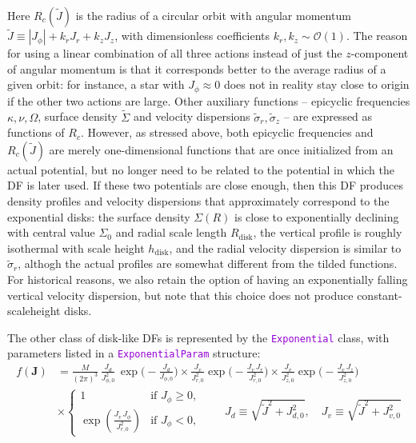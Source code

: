 \documentclass[12pt]{article}
\newcommand{\ttt}[1]{\textcolor{darkviolet}{\texttt{#1}}}
\newcommand{\bJ}{\boldsymbol{J}}
\begin{document}
Here $R_c(\tilde J)$ is the radius of a circular orbit with angular momentum $\tilde J\equiv |J_\phi| + k_r J_r + k_z J_z$, with dimensionless coefficients $k_r,k_z\sim \mathcal{O}(1)$. The reason for using a linear combination of all three actions instead of just the $z$-component of angular momentum is that it corresponds better to the average radius of a given orbit: for instance, a star with $J_\phi\approx 0$ does not in reality stay close to origin if the other two actions are large. Other auxiliary functions -- epicyclic frequencies $\kappa,\nu,\Omega$, surface density $\tilde\Sigma$ and velocity dispersions $\tilde\sigma_r,\tilde\sigma_z$ -- are expressed as functions of $R_c$. However, as stressed above, both epicyclic frequencies and $R_c(\tilde J)$ are merely one-dimensional functions that are once initialized from an actual potential, but no longer need to be related to the potential in which the DF is later used. If these two potentials are close enough, then this DF produces density profiles and velocity dispersions that approximately correspond to the exponential disks: the surface density $\Sigma(R)$ is close to exponentially declining with central value $\Sigma_0$ and radial scale length $R_\mathrm{disk}$, the vertical profile is roughly isothermal with scale height $h_\mathrm{disk}$, and the radial velocity dispersion is similar to $\tilde\sigma_r$, althogh the actual profiles are somewhat different from the tilded functions. For historical reasons, we also retain the option of having an exponentially falling vertical velocity dispersion, but note that this choice does not produce constant-scaleheight disks.

The other class of disk-like DFs is represented by the \ttt{Exponential} class, with parameters listed in a \ttt{ExponentialParam} structure:
\begin{align*}
f(\bJ) &= \frac{M}{(2\pi)^3}\, \frac{J_d}{J_{\phi,0}^2}\, \exp\bigg(-\frac{J_d}{J_{\phi,0}}\bigg) \times
\frac{J_v}{J_{r,0}^2} \exp\bigg(-\frac{J_v\,J_r}{J_{r,0}^2}\bigg) \times
\frac{J_v}{J_{z,0}^2} \exp\bigg(-\frac{J_v\,J_z}{J_{z,0}^2}\bigg) \\
&\times \left\{ \begin{array}{ll}  1 & \mbox{if }J_\phi\ge 0, \\
\exp\left(\frac{J_v\,J_\phi}{J_{r,0}^2} \right) & \mbox{if }J_\phi<0, \end{array} \right. \qquad
J_d \equiv \sqrt{\tilde J^2 + J_{d,0}^2}, \quad
J_v \equiv \sqrt{\tilde J^2 + J_{v,0}^2}
\end{align*}
\end{document}
